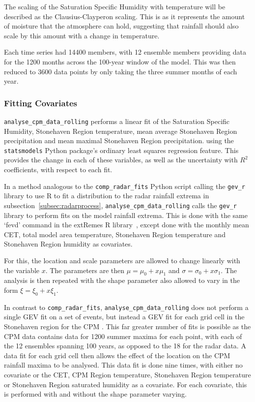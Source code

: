The scaling of the Saturation Specific Humidity with temperature will be described as the Clausius-Clayperon scaling.
This is as it represents the amount of moisture that the atmosphere can hold,
    suggesting that rainfall should also scale by this amount with a change in temperature.

Each time series had 14400 members,
    with 12 ensemble members providing data for the 1200 months across the 100-year window of the model.
This was then reduced to 3600 data points by only taking the three summer months of each year.

\subsubsection{Fitting Covariates}

\texttt{analyse\_cpm\_data\_rolling} performs a linear fit of the Saturation Specific Humidity,
    Stonehaven Region temperature, mean average Stonehaven Region precipitation and mean maximal Stonehaven Region precipitation.
    using the \texttt{statsmodels} Python package's ordinary least squares regression feature.
This provides the change in each of these variables, as well as the uncertainty with $R^2$ coefficients,
    with respect to each fit.

In a method analogous to the \texttt{comp\_radar\_fits} Python script calling the \texttt{gev\_r} library to use R to fit
    a distribution to the radar rainfall extrema in subsection~\ref{subsec:radarprocess},
    \texttt{analyse\_cpm\_data\_rolling} calls the \texttt{gev\_r} library to perform fits on the model rainfall extrema.
This is done with the same `fevd' command in the extRemes R library~\cite{extremes_R},
    except done with the monthly mean CET, total model area temperature, Stonehaven Region temperature and Stonehaven Region humidity as covariates.

For this,
    the location and scale parameters are allowed to change linearly with the variable $x$.
The parameters are then $\mu = \mu_0 + x\mu_1$ and $\sigma = \sigma_0 + x\sigma_1$.
The analysis is then repeated with the shape parameter also allowed to vary in the form $\xi = \xi_0 + x\xi_1$.

In contrast to \texttt{comp\_radar\_fits},
    \texttt{analyse\_cpm\_data\_rolling} does not perform a single GEV fit on a set of events,
    but instead a GEV fit for each grid cell in the Stonehaven region for the CPM .
This far greater number of fits is possible as the CPM data contains data for 1200 summer maxima for each point,
    with each of the 12 ensembles spanning 100 years,
    as opposed to the 18 for the radar data.
A data fit for each grid cell then allows the effect of the location on the CPM rainfall maxima to be analysed.
This data fit is done nine times,
    with either no covariate or the CET, CPM Region temperature, Stonehaven Region temperature or Stonehaven Region saturated humidity as a covariate.
For each covariate, this is performed with and without the shape parameter varying.

